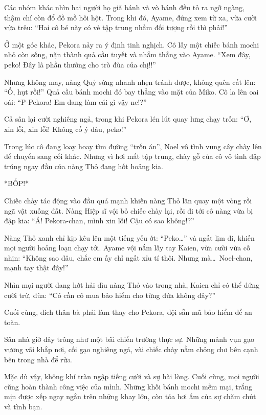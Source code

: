 \documentclass[../main.tex]{subfiles}
\begin{document}
Các nhóm khác nhìn hai người họ giã bánh và vò bánh đều tỏ ra ngỡ ngàng, thậm chí còn đổ đồ mồ hôi hột. Trong khi đó, Ayame, đứng xem từ xa, vừa cười vừa trêu: ``Hai cô bé này có vẻ tập trung nhầm đối tượng rồi thì phải!''

Ở một góc khác, Pekora nảy ra ý định tinh nghịch. Cô lấy một chiếc bánh mochi nhỏ còn sống, nặn thành quả cầu tuyết và nhắm thẳng vào Ayame. ``Xem đây, peko! Đây là phần thưởng cho trò đùa của chị!!''

Nhưng không may, nàng Quỷ sừng nhanh nhẹn tránh được, không quên cất lên: ``Ố, hụt rồi!'' Quả cầu bánh mochi đó bay thẳng vào mặt của Miko. Cô la lên oai oái: ``P-Pekora! Em đang làm cái gì vậy ne!?''

Cả sân lại cười nghiêng ngả, trong khi Pekora lén lút quay lưng chạy trốn: ``Ơ, xin lỗi, xin lỗi! Không cố ý đâu, peko!''

Trong lúc cô đang loay hoay tìm đường ``trốn án'', Noel vô tình vung cây chày lên để chuyển sang cối khác. Nhưng vì hơi mất tập trung, chày gỗ của cô vô tình đập trúng ngay đầu của nàng Thỏ đang hốt hoảng kia.

*BỐP!*

Chiếc chày tác động vào đầu quá mạnh khiến nàng Thỏ lăn quay một vòng rồi ngã vật xuống đất. Nàng Hiệp sĩ vội bỏ chiếc chày lại, rồi đi tới cô nàng vừa bị đập kia: ``Á! Pekora-chan, mình xin lỗi! Cậu có sao không!?''

Nàng Thỏ xanh chỉ kịp kêu lên một tiếng yếu ớt: ``Peko\dots'' và ngất lịm đi, khiến mọi người hoảng loạn chạy tới. Ayame vội nắm lấy tay Kaien, vừa cười vừa cố nhịn: ``Không sao đâu, chắc em ấy chỉ ngất xỉu tí thôi. Nhưng mà\dots\ Noel-chan, mạnh tay thật đấy!''

Nhìn mọi người đang hớt hải dìu nàng Thỏ vào trong nhà, Kaien chỉ có thể đứng cười trừ, đùa: ``Có cần cô mua bảo hiểm cho từng đứa không đây?''

Cuối cùng, đích thân bà phải làm thay cho Pekora, đội sẵn mũ bảo hiểm để an toàn.

\ct

Sân nhà giờ đây trông như một bãi chiến trường thực sự. Những mảnh vụn gạo vương vãi khắp nơi, cối gạo nghiêng ngả, vài chiếc chày nằm chỏng chơ bên cạnh bên trong nhà để rửa.

Mặc dù vậy, không khí tràn ngập tiếng cười và sự hài lòng. Cuối cùng, mọi người cũng hoàn thành công việc của mình. Những khối bánh mochi mềm mại, trắng mịn được xếp ngay ngắn trên những khay lớn, còn tỏa hơi ấm của sự chăm chút và tình bạn.
\end{document}

